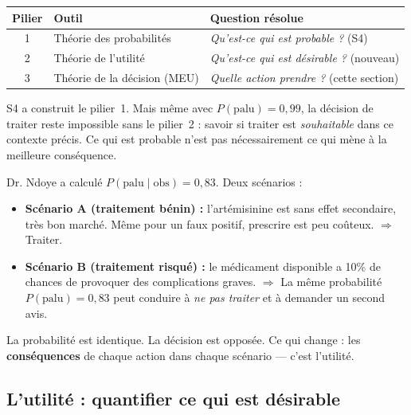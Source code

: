 \documentclass[11pt,a4paper]{article}
\begin{document}
\begin{center}
\renewcommand{\arraystretch}{1.5}
\begin{tabular}{clp{7cm}}
\toprule
\textbf{Pilier} & \textbf{Outil} & \textbf{Question résolue} \\
\midrule
1 & Théorie des probabilités & \textit{Qu'est-ce qui est probable ?} (S4) \\
2 & Théorie de l'utilité       & \textit{Qu'est-ce qui est désirable ?} (nouveau) \\
3 & Théorie de la décision (MEU) & \textit{Quelle action prendre ?} (cette section) \\
\bottomrule
\end{tabular}
\end{center}

S4 a construit le pilier~1. Mais même avec $P(\text{palu}) = 0{,}99$, la décision de traiter reste impossible sans le pilier~2 : savoir si traiter est \textit{souhaitable} dans ce contexte précis. Ce qui est probable n'est pas nécessairement ce qui mène à la meilleure conséquence.

\begin{exemplebox}
Dr. Ndoye a calculé $P(\text{palu} \mid \text{obs}) = 0{,}83$. Deux scénarios :
\begin{itemize}[nosep]
    \item \textbf{Scénario A (traitement bénin) :} l'artémisinine est sans effet secondaire, très bon marché. Même pour un faux positif, prescrire est peu coûteux. $\Rightarrow$ Traiter.
    \item \textbf{Scénario B (traitement risqué) :} le médicament disponible a 10\% de chances de provoquer des complications graves. $\Rightarrow$ La même probabilité $P(\text{palu}) = 0{,}83$ peut conduire à \textit{ne pas traiter} et à demander un second avis.
\end{itemize}
La probabilité est identique. La décision est opposée. Ce qui change : les \textbf{conséquences} de chaque action dans chaque scénario --- c'est l'utilité.
\end{exemplebox}

\subsection{L'utilité : quantifier ce qui est désirable}
\end{document}
